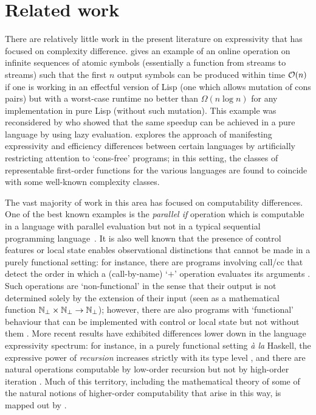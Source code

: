 \documentclass[12pt,phd,lfcs,twoside,openright,logo,leftchapter,normalheadings]{infthesis}
\theoremstyle{plain}
\theoremstyle{definition}
\begin{document}
\section{Related work}
\label{sec:related-work-efficiency}
There are relatively little work in the present literature on
expressivity that has focused on complexity difference.
%
\citet{Pippenger96} gives an example of an online operation on
infinite sequences of atomic symbols (essentially a function from
streams to streams) such that the first $n$ output symbols can be
produced within time $\mathcal{O}(n)$ if one is working in an effectful
version of Lisp (one which allows mutation of cons pairs) but with a
worst-case runtime no better than $\Omega(n \log n)$ for any
implementation in pure Lisp (without such mutation). This example was
reconsidered by \citet{BirdJdM97} who showed that the same speedup can
be achieved in a pure language by using lazy evaluation.
\citet{Jones01} explores the approach of manifesting expressivity and
efficiency differences between certain languages by artificially
restricting attention to `cons-free' programs; in this setting, the
classes of representable first-order functions for the various
languages are found to coincide with some well-known complexity
classes.

The vast majority of work in this area has focused on computability
differences. One of the best known examples is the \emph{parallel if}
operation which is computable in a language with parallel evaluation
but not in a typical sequential programming
language~\cite{Plotkin77}. It is also well known that the presence of
control features or local state enables observational distinctions
that cannot be made in a purely functional setting: for instance,
there are programs involving call/cc that detect the order in which a
(call-by-name) `$+$' operation evaluates its arguments
\citep{CartwrightF92}. Such operations are `non-functional' in the
sense that their output is not determined solely by the extension of
their input (seen as a mathematical function
$\mathbb{N}_\bot \times \mathbb{N}_\bot \rightarrow \mathbb{N}_\bot$);
however, there are also programs with `functional' behaviour that can
be implemented with control or local state but not without them
\citep{Longley99}.  More recent results have exhibited differences
lower down in the language expressivity spectrum: for instance, in a
purely functional setting \textit{\`a la} Haskell, the expressive
power of \emph{recursion} increases strictly with its type level
\citep{Longley18a}, and there are natural operations computable by
low-order recursion but not by high-order iteration
\citep{Longley19}. Much of this territory, including the mathematical
theory of some of the natural notions of higher-order computability
that arise in this way, is mapped out by \citet{LongleyN15}.
\end{document}
